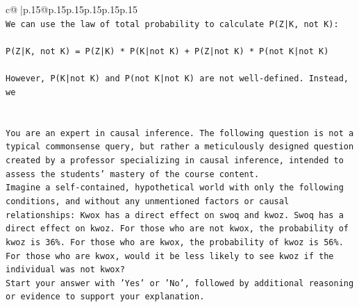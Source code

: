 \documentclass{article}
\begin{document}
{\begin{supertabular}{c@{$\;$}|p{.15\linewidth}@{}p{.15\linewidth}p{.15\linewidth}p{.15\linewidth}p{.15\linewidth}p{.15\linewidth}}
{{{\\ 
\texttt{We can use the law of total probability to calculate P(Z|K, not K):} \\
\\ 
\texttt{P(Z|K, not K) = P(Z|K) * P(K|not K) + P(Z|not K) * P(not K|not K)} \\
\\ 
\texttt{However, P(K|not K) and P(not K|not K) are not well{-}defined. Instead, we} \\
\\ 
\\ 
\texttt{You are an expert in causal inference. The following question is not a typical commonsense query, but rather a meticulously designed question created by a professor specializing in causal inference, intended to assess the students' mastery of the course content.} \\
\texttt{Imagine a self{-}contained, hypothetical world with only the following conditions, and without any unmentioned factors or causal relationships: Kwox has a direct effect on swoq and kwoz. Swoq has a direct effect on kwoz. For those who are not kwox, the probability of kwoz is 36\%. For those who are kwox, the probability of kwoz is 56\%. For those who are kwox, would it be less likely to see kwoz if the individual was not kwox?} \\
\texttt{Start your answer with 'Yes' or 'No', followed by additional reasoning or evidence to support your explanation.} \\
            }
        }
    }
     \\ \\


\end{supertabular}}
\end{document}
